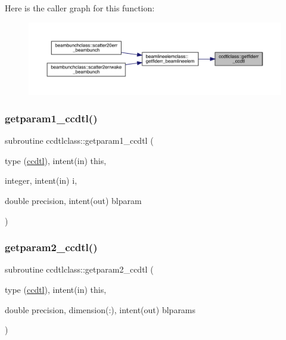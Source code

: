 Here is the caller graph for this function\+:\nopagebreak
\begin{figure}[H]
\begin{center}
\leavevmode
\includegraphics[width=350pt]{namespaceccdtlclass_ab81d1b262943e405eebe3bfef401bb97_icgraph}
\end{center}
\end{figure}
\mbox{\label{namespaceccdtlclass_a027b988ab66d8b89dabf46f5e45d82f5}} 
\subsubsection{\texorpdfstring{getparam1\_ccdtl()}{getparam1\_ccdtl()}}
{\footnotesize\ttfamily subroutine ccdtlclass\+::getparam1\+\_\+ccdtl (\begin{DoxyParamCaption}\item[{type (\mbox{\hyperlink{namespaceccdtlclass_structccdtlclass_1_1ccdtl}{ccdtl}}), intent(in)}]{this,  }\item[{integer, intent(in)}]{i,  }\item[{double precision, intent(out)}]{blparam }\end{DoxyParamCaption})}

\mbox{\label{namespaceccdtlclass_a8455f87d9ac20671adf737902c8b90d8}} 
\subsubsection{\texorpdfstring{getparam2\_ccdtl()}{getparam2\_ccdtl()}}
{\footnotesize\ttfamily subroutine ccdtlclass\+::getparam2\+\_\+ccdtl (\begin{DoxyParamCaption}\item[{type (\mbox{\hyperlink{namespaceccdtlclass_structccdtlclass_1_1ccdtl}{ccdtl}}), intent(in)}]{this,  }\item[{double precision, dimension(\+:), intent(out)}]{blparams }\end{DoxyParamCaption})}


